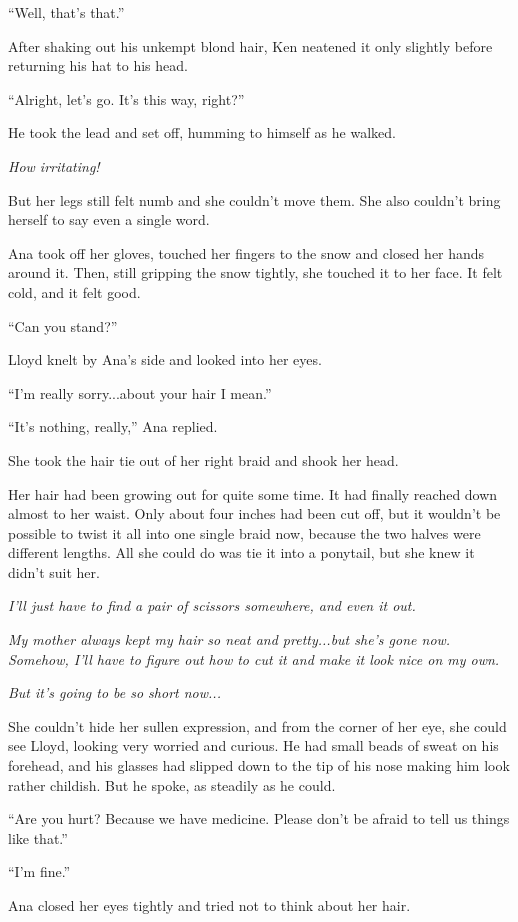 \documentclass[
]{article}
\begin{document}
``Well, that's that.''

After shaking out his unkempt blond hair, Ken neatened it only slightly
before returning his hat to his head.

``Alright, let's go. It's this way, right?''

He took the lead and set off, humming to himself as he walked.

\emph{How irritating!}

But her legs still felt numb and she couldn't move them. She also
couldn't bring herself to say even a single word.

Ana took off her gloves, touched her fingers to the snow and closed her
hands around it. Then, still gripping the snow tightly, she touched it
to her face. It felt cold, and it felt good.

``Can you stand?''

Lloyd knelt by Ana's side and looked into her eyes.

``I'm really sorry...about your hair I mean.''

``It's nothing, really,'' Ana replied.

She took the hair tie out of her right braid and shook her head.

Her hair had been growing out for quite some time. It had finally
reached down almost to her waist. Only about four inches had been cut
off, but it wouldn't be possible to twist it all into one single braid
now, because the two halves were different lengths. All she could do was
tie it into a ponytail, but she knew it didn't suit her.

\emph{I'll just have to find a pair of scissors somewhere, and even it
out.}

\emph{My mother always kept my hair so neat and pretty...but she's gone
now. Somehow, I'll have to figure out how to cut it and make it look
nice on my own.}

\emph{But it's going to be so short now...}

She couldn't hide her sullen expression, and from the corner of her eye,
she could see Lloyd, looking very worried and curious. He had small
beads of sweat on his forehead, and his glasses had slipped down to the
tip of his nose making him look rather childish. But he spoke, as
steadily as he could.

``Are you hurt? Because we have medicine. Please don't be afraid to tell
us things like that.''

``I'm fine.''

Ana closed her eyes tightly and tried not to think about her hair.
\end{document}

